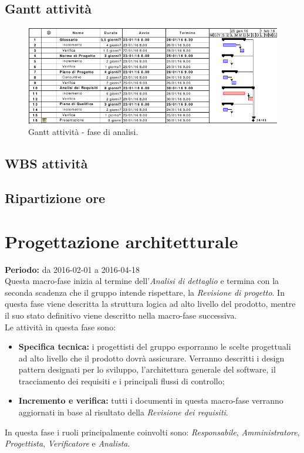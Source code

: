 \documentclass[a4paper]{report}
\begin{document}
			\subsection{Gantt attività}
				\begin{figure}[H]
					\centering
					\includegraphics[scale=0.5]{gantt-analisidettaglio}
					\caption{Gantt attività - fase di analisi.}
				\end{figure}
			\subsection{WBS attività}
			\subsection{Ripartizione ore}
		\section{Progettazione architetturale}
			\textbf{Periodo:} da 2016-02-01 a 2016-04-18 \\
			Questa macro-fase inizia al termine dell'\emph{Analisi di dettaglio} e termina con la seconda 
			scadenza che il gruppo intende rispettare, la \emph{Revisione di progetto}. In questa fase viene 
			descritta la struttura logica ad alto livello del prodotto, mentre il suo stato definitivo viene 
			descritto nella macro-fase successiva. \\
			Le attività in questa fase sono:
			\begin{itemize}
				\item \textbf{Specifica tecnica:} i progettisti del gruppo esporranno le scelte progettuali ad alto 
				livello che il prodotto dovrà assicurare. Verranno descritti i design pattern designati per lo sviluppo, 
				l'architettura generale del software, il tracciamento dei requisiti e i principali flussi di controllo;
				\item \textbf{Incremento e verifica:} tutti i documenti in questa macro-fase verranno aggiornati in base 
				al risultato della \emph{Revisione dei requisiti}.
			\end{itemize}
			In questa fase i ruoli principalmente coinvolti sono: \emph{Responsabile}, \emph{Amministratore},
			\emph{Progettista}, \emph{Verificatore} e  \emph{Analista}.
\end{document}
